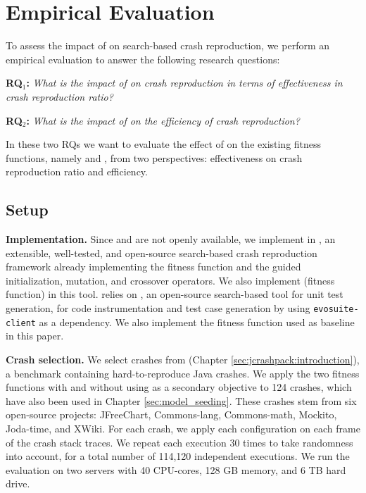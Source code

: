 \section{Empirical Evaluation}
\label{sec:bbc:setup}
To assess the impact of \bbc on search-based crash reproduction, we perform an empirical evaluation to answer the following research questions:

\textbf{RQ$_1$: } \textit{What is the impact of \bbc on crash reproduction in terms of effectiveness in crash reproduction ratio?}

\textbf{RQ$_2$: } \textit{What is the impact of \bbc on the efficiency of crash reproduction?}

In these two RQs we want to evaluate the effect of \bbc on the existing fitness functions, namely \integ and \WS, from two perspectives: effectiveness on crash reproduction ratio and efficiency.

\subsection{Setup}

\textbf{Implementation. }
%
Since \recore and \evocrash are not openly available, we implement \bbc in \botsing, an extensible, well-tested, and open-source search-based crash reproduction framework already implementing the \WS fitness function and the guided initialization, mutation, and crossover operators. We also implement \integ (\recore fitness function) in this tool.
\botsing relies on \evosuite \cite{Fraser2011}, an open-source search-based tool for unit test generation, for code instrumentation and test case generation by using \texttt{evosuite-client} as a dependency. 
We also implement the \integ fitness function used as baseline in this paper.

\textbf{Crash selection. }
%
We select crashes from \crashpack (Chapter \ref{sec:jcrashpack:introduction}), a benchmark containing hard-to-reproduce Java crashes.
We apply the two fitness functions with and without using \bbc as a secondary objective to 124 crashes, which have also been used in Chapter \ref{sec:model_seeding}. 
These crashes stem from six open-source projects: \textrm{JFreeChart}, \textrm{Commons-lang}, \textrm{Commons-math}, \textrm{Mockito}, \textrm{Joda-time}, and \textrm{XWiki}.
For each crash, we apply each configuration on each frame of the crash stack traces. We repeat each execution 30 times to take randomness into account, for a total number of 114,120 independent executions.
We run the evaluation on two servers with 40 CPU-cores, 128 GB memory, and 6 TB hard drive.

